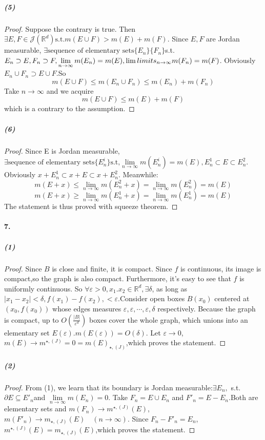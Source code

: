 \documentclass{article}
\begin{document}
\subparagraph{(5)}
\begin{proof}
Suppose the contrary is true. Then $\exists E,F\in \mathcal{J}(\mathbb{R}^d)\text{s.t.} m(E\cup F)>m(E)+m(F)$. Since $E,F$ are Jordan measurable, $\exists \text{sequence of elementary sets} \{E_n\}\{F_n\}$s.t. $E_n\supset E,F_n\supset F,\lim\limits_{n\to\infty}m(E_n)=m(E),\lim\\limits_{n\to\infty}m(F_n)=m(F)$. Obviously $E_n\cup F_n\supset E\cup F$.So
\[m(E\cup F)\leq m(E_n\cup F_n)\leq m(E_n)+m(F_n)\]
Take $n\to\infty$ and we acquire
\[m(E\cup F)\leq m(E)+m(F)\]
which is a contrary to the assumption.
\end{proof}

\subparagraph{(6)}
\begin{proof}
Since E is Jordan measurable, $\exists \text{sequence of elementary sets} \{E^i_n\} \text{s.t,} \lim\limits_{n\to\infty}m(E^i_n)=m(E), E^1_n\subset E\subset E^2_n$. Obviously $x+E^1_n\subset x+E \subset x+E^2_n$. Meanwhile:
\[m(E+x)\leq\lim_{n\to\infty}m(E^2_n+x)=\lim_{n\to\infty}m(E^2_n)=m(E)\]
\[m(E+x)\geq\lim_{n\to\infty}m(E^1_n+x)=\lim_{n\to\infty}m(E^1_n)=m(E)\]
The statement is thus proved with squeeze theorem.
\end{proof}

\paragraph{7.}
\subparagraph{(1)}\begin{proof}
Since $B$ is close and finite, it is compact. Since $f$ is continuous, its image is compact,so the graph is also compact. Furthermore, it's easy to see that $f$ is uniformly continuous. So $\forall \varepsilon > 0,x_1.x_2\in \mathbb{R}^d,\exists \delta$, as long as $|x_1-x_2|<\delta,f(x_1)-f(x_2),<\varepsilon$.Consider open boxes $B(x_0)$ centered at $(x_0,f(x_0))$ whose edges measures $\varepsilon,\varepsilon,\cdots,\varepsilon,\delta$ respectively. Because the graph is compact, up to $O(\frac{|B|}{\varepsilon^d})$ boxes cover the whole graph, which unions into an elementary set $E(\varepsilon)$.$m(E(\varepsilon))=O(\delta)$. Let $\varepsilon \to 0$, $m(E)\to m^{\star,(J)}=0=m(E)_{\star,(J)}$,which proves the statement.  
\end{proof}

\subparagraph{(2)}
\begin{proof}
From (1), we learn that its boundary is Jordan measurable:$\exists E_n,$ s.t. $\partial E\subseteq E'_n$and $\lim\limits_{n\to \infty}m(E_n)=0$. Take $F_n=E\cup E_n$ and $F'_n=E-E_n$.Both are elementary sets and $m(F_n)\to m^{\star,(J)}(E)$,$m(F'_n)\to m_{\star,(J)}(E)\quad (n\to \infty)$. Since $F_n-F'_n=E_n$,$m^{\star,(J)}(E)=m_{\star,(J)}(E)$,which proves the statement. 
\end{proof}
\end{document}
